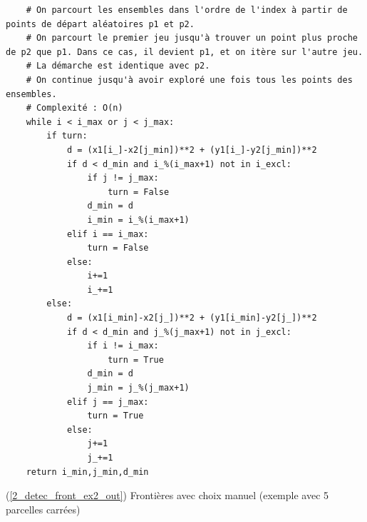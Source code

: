\documentclass[12pt]{article}
\begin{document}
\begin{lstlisting}
    # On parcourt les ensembles dans l'ordre de l'index à partir de points de départ aléatoires p1 et p2.
    # On parcourt le premier jeu jusqu'à trouver un point plus proche de p2 que p1. Dans ce cas, il devient p1, et on itère sur l'autre jeu.
    # La démarche est identique avec p2.
    # On continue jusqu'à avoir exploré une fois tous les points des ensembles.
    # Complexité : O(n)
    while i < i_max or j < j_max:
        if turn:
            d = (x1[i_]-x2[j_min])**2 + (y1[i_]-y2[j_min])**2
            if d < d_min and i_%(i_max+1) not in i_excl:
                if j != j_max:
                    turn = False
                d_min = d
                i_min = i_%(i_max+1)
            elif i == i_max:
                turn = False
            else:
                i+=1
                i_+=1
        else:
            d = (x1[i_min]-x2[j_])**2 + (y1[i_min]-y2[j_])**2
            if d < d_min and j_%(j_max+1) not in j_excl:
                if i != i_max:
                    turn = True
                d_min = d
                j_min = j_%(j_max+1)
            elif j == j_max:
                turn = True
            else:
                j+=1
                j_+=1
    return i_min,j_min,d_min\end{lstlisting}

\newpage
    \label{2_detec_front_ex2_in} (\ref{2_detec_front_ex2_out}) Frontières avec choix manuel (exemple avec 5 parcelles carrées)
\end{document}
